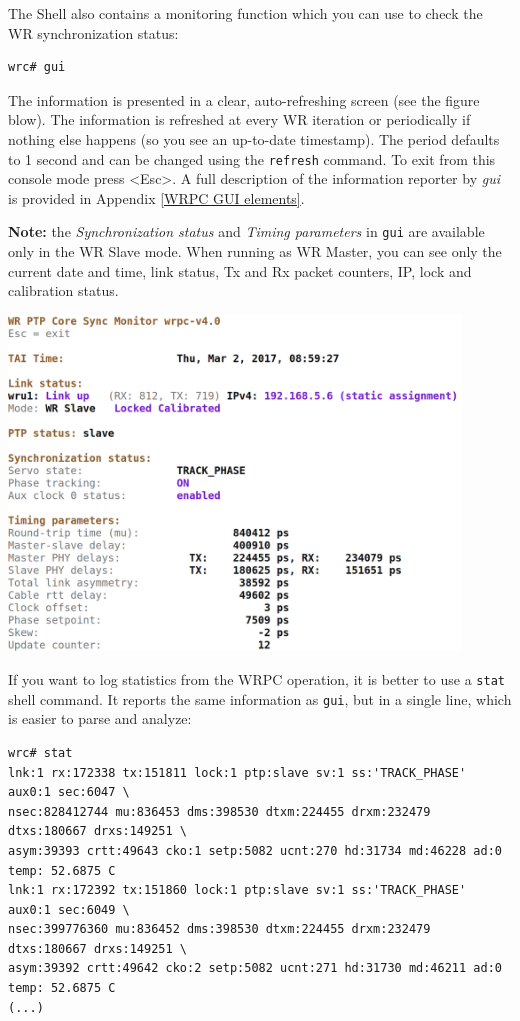 \documentclass[a4paper, 12pt]{article}
\renewcommand{\_}{\underscore\allowbreak}
\begin{document}
The Shell also contains a monitoring function which you can use to check the
WR synchronization status:

\begin{lstlisting}
wrc# gui
\end{lstlisting}

The information is presented in a clear, auto-refreshing screen (see the figure blow). 
The information is refreshed at every WR iteration or periodically if
nothing else happens (so you see an up-to-date timestamp). The period
defaults to 1 second and can be changed using the \texttt{refresh} command. To
exit from this console mode press <Esc>. A full description of the information
reporter by \textit{gui} is provided in Appendix \ref{WRPC GUI elements}.

\noindent\textbf{Note:} the \textit{Synchronization status} and \textit{Timing
parameters} in \texttt{gui} are available only in the WR Slave mode. When
running as WR Master, you can see only the current date and time,
link status, Tx and Rx packet counters, IP, lock and calibration status.

\vspace{1em}
\includegraphics[width=12cm]{wrpc_mon.png}
\vspace{1em}

If you want to log statistics from the WRPC operation, it is better to use a
\texttt{stat} shell command. It reports the same information as \texttt{gui},
but in a single line, which is easier to parse and analyze:

\begin{lstlisting}
wrc# stat
lnk:1 rx:172338 tx:151811 lock:1 ptp:slave sv:1 ss:'TRACK_PHASE' aux0:1 sec:6047 \
nsec:828412744 mu:836453 dms:398530 dtxm:224455 drxm:232479 dtxs:180667 drxs:149251 \
asym:39393 crtt:49643 cko:1 setp:5082 ucnt:270 hd:31734 md:46228 ad:0 temp: 52.6875 C
lnk:1 rx:172392 tx:151860 lock:1 ptp:slave sv:1 ss:'TRACK_PHASE' aux0:1 sec:6049 \
nsec:399776360 mu:836452 dms:398530 dtxm:224455 drxm:232479 dtxs:180667 drxs:149251 \
asym:39392 crtt:49642 cko:2 setp:5082 ucnt:271 hd:31730 md:46211 ad:0 temp: 52.6875 C
(...)
\end{lstlisting}
\end{document}
